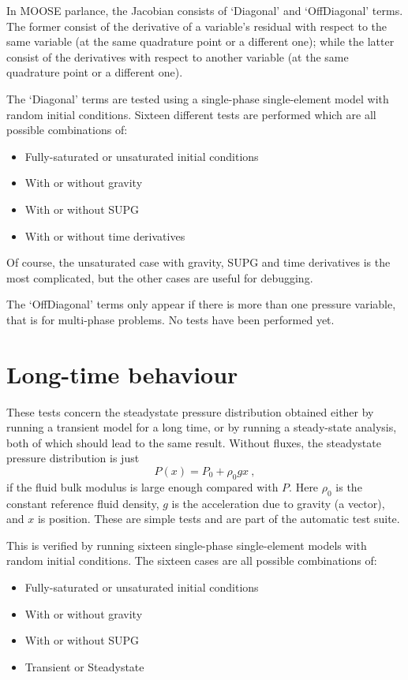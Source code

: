 \documentclass[]{scrreprt}
\begin{document}
In MOOSE parlance, the Jacobian consists of `Diagonal' and
`OffDiagonal' terms.  The former consist of the derivative of a
variable's residual with respect to the same variable (at the same
quadrature point or a different one); while the latter
consist of the derivatives with respect to another variable (at the
same quadrature point or a different one).

The `Diagonal' terms are tested using a single-phase single-element
model with random initial conditions.  Sixteen different tests are
performed which are all possible combinations of:
\begin{itemize}
\item Fully-saturated or unsaturated initial conditions
\item With or without gravity
\item With or without SUPG
\item With or without time derivatives
\end{itemize}
Of course, the unsaturated case with gravity, SUPG and time
derivatives is the most complicated, but the other cases are useful
for debugging.

The `OffDiagonal' terms only appear if there is more than one pressure
variable, that is for multi-phase problems.  No tests have been
performed yet.



\chapter{Long-time behaviour}
\label{gh}

These tests concern the steadystate pressure distribution obtained
either by running a transient model for a long time, or by running a
steady-state analysis, both of which should lead to the same result.
Without fluxes, the steadystate pressure distribution is just
\begin{equation}
P(x) = P_{0} + \rho_{0} g x \ ,
\end{equation}
if the fluid bulk modulus is large enough compared with $P$.  Here
$\rho_{0}$ is the constant reference fluid density, $g$ is the
acceleration due to gravity (a vector), and $x$ is position.  These
are simple tests and are part of the automatic test suite.

This is verified by running sixteen single-phase single-element models
with random initial conditions.  The sixteen cases are all possible
combinations of:
\begin{itemize}
\item Fully-saturated or unsaturated initial conditions
\item With or without gravity
\item With or without SUPG
\item Transient or Steadystate
\end{itemize}
\end{document}
